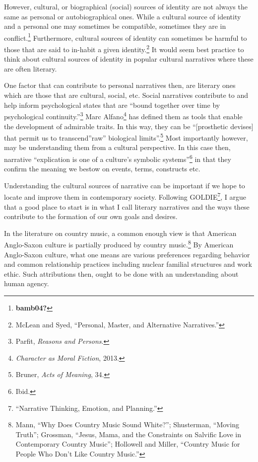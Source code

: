 \documentclass[
  12pt,
]{book}
\theoremstyle{definition}
\theoremstyle{definition}
\theoremstyle{definition}
\theoremstyle{definition}
\theoremstyle{remark}
\begin{document}
However, cultural, or biographical (social) sources of identity are not always the same as personal or autobiographical ones. While a cultural source of identity and a personal one may sometimes be compatible, sometimes they are in conflict.\footnote{\textbf{bamb04?}} Furthermore, cultural sources of identity can sometimes be harmful to those that are said to in-habit a given identity.\footnote{McLean and Syed, {``Personal, {Master}, and {Alternative Narratives}.''}} It would seem best practice to think about cultural sources of identity in popular cultural narratives where these are often literary.

One factor that can contribute to personal narratives then, are literary ones which are those that are cultural, social, etc. Social narratives contribute to and help inform psychological states that are ``bound together over time by psychological continuity.''\footnote{Parfit, \emph{Reasons and Persons}.} Marc Alfano\footnote{\emph{Character as Moral Fiction}, 2013.} has defined them as tools that enable the development of admirable traits. In this way, they can be ``{[}prosthetic devises{]} that permit us to transcend''raw'' biological limits''.\footnote{Bruner, \emph{Acts of Meaning}, 34.} Most importantly however, may be understanding them from a cultural perspective. In this case then, narrative ``explication is one of a culture's symbolic systems''\footnote{Ibid.} in that they confirm the meaning we bestow on events, terms, constructs etc.

Understanding the cultural sources of narrative can be important if we hope to locate and improve them in contemporary society. Following GOLDIE\footnote{{``Narrative {Thinking}, {Emotion}, and {Planning}.''}}, I argue that a good place to start is in what I call literary narratives and the ways these contribute to the formation of our own goals and desires.

In the literature on country music, a common enough view is that American Anglo-Saxon culture is partially produced by country music.\footnote{Mann, {``Why Does Country Music Sound White?''}; Shusterman, {``Moving {Truth}''}; Grossman, {``Jesus, {Mama}, and the {Constraints} on {Salvific Love} in {Contemporary Country Music}''}; Hollowell and Miller, {``Country {Music} for {People Who Don}'t {Like Country Music}.''}} By American Anglo-Saxon culture, what one means are various preferences regarding behavior and common relationship practices including nuclear familial structures and work ethic. Such attributions then, ought to be done with an understanding about human agency.
\end{document}
